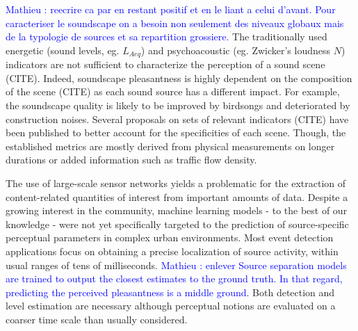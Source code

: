 \documentclass{article}
\newcommand{\ml}[1]{\textcolor{blue}{ Mathieu : #1}}
\begin{document}
\begin{sloppy}
\ml{reecrire ca par en restant positif et en le liant a celui d'avant. Pour caracteriser le soundscape on a besoin non seulement des niveaux globaux mais de la typologie de sources et sa repartition grossiere.}
The traditionally used energetic (sound levels, eg. $L_{Aeq}$) and psychoacoustic (eg. Zwicker's loudness $N$) indicators are not sufficient to characterize the perception of a sound scene (CITE). Indeed, soundscape pleasantness is highly dependent on the composition of the scene (CITE) as each sound source has a different impact. For example, the soundscape quality is likely to be improved by birdsongs and deteriorated by construction noises. Several proposals on sets of relevant indicators (CITE) have been published to better account for the specificities of each scene. Though, the established metrics are mostly derived from physical measurements on longer durations or added information such as traffic flow density.

The use of large-scale sensor networks yields a problematic for the extraction of content-related quantities of interest from important amounts of data. Despite a growing interest in the community, machine learning models - to the best of our knowledge - were not yet specifically targeted to the prediction of source-specific perceptual parameters in complex urban environments. Most event detection applications focus on obtaining a precise localization of source activity, within usual ranges of tens of milliseconds. \ml{enlever Source separation models are trained to output the closest estimates to the ground truth. In that regard, predicting the perceived pleasantness is a middle ground}. Both detection and level estimation are necessary although perceptual notions are evaluated on a coarser time scale than usually considered. %



\end{sloppy}
\end{document}
